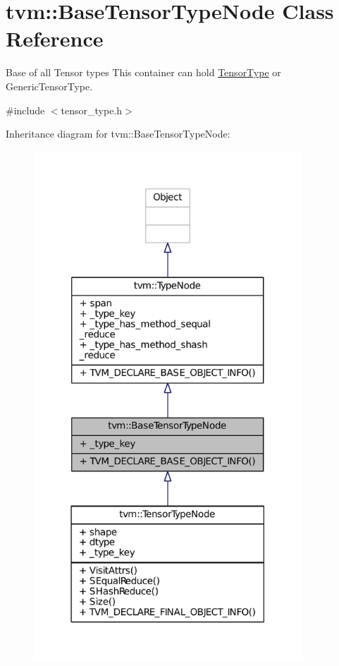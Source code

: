 \hypertarget{classtvm_1_1BaseTensorTypeNode}{}\section{tvm\+:\+:Base\+Tensor\+Type\+Node Class Reference}
\label{classtvm_1_1BaseTensorTypeNode}


Base of all Tensor types This container can hold \hyperlink{classtvm_1_1TensorType}{Tensor\+Type} or Generic\+Tensor\+Type.  




{\ttfamily \#include $<$tensor\+\_\+type.\+h$>$}



Inheritance diagram for tvm\+:\+:Base\+Tensor\+Type\+Node\+:
\nopagebreak
\begin{figure}[H]
\begin{center}
\leavevmode
\includegraphics[width=285pt]{classtvm_1_1BaseTensorTypeNode__inherit__graph}
\end{center}
\end{figure}


